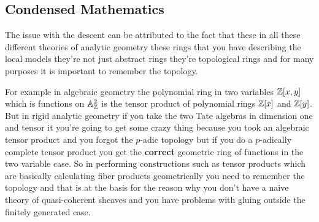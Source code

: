 

\subsection{Condensed Mathematics}

 The issue with the descent can be attributed to the fact that these in all these different theories of analytic geometry these rings that you have describing the local models they're not just abstract rings they're topological rings and for many purposes it is important to remember the topology.

 For example in algebraic geometry the polynomial ring in two variables $\Bbb{Z}[x,y]$ which is functions on $\Bbb{A}^{2}_{\Bbb{Z}}$ is the tensor product of polynomial rings $\Bbb{Z}[x]$ and $\Bbb{Z}[y]$. But in rigid analytic geometry if you take the two Tate algebras in dimension one and tensor it you're going to get some crazy thing because you took an algebraic tensor product and you forgot the $p$-adic topology but if you do a $p$-adically complete tensor product you get the \textbf{correct} geometric ring of functions in the two variable case. So in performing constructions such as tensor products which are basically calculating fiber products geometrically you need to remember the topology and that is at the basis for the reason why you don't have a naive theory of quasi-coherent sheaves and you have problems with gluing outside the finitely generated case.

